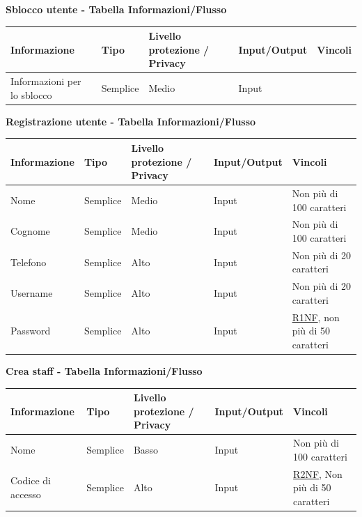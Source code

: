 \documentclass[a4paper]{article}
\begin{document}
\textbf{Sblocco utente  - Tabella Informazioni/Flusso}

\begin{center}
    \begin{tabularx}{1\textwidth}{|X|X|X|X|X|}
        \hline
        \textbf{Informazione} &\textbf{Tipo} & \textbf{Livello protezione / Privacy} & \textbf{Input/Output} & \textbf{Vincoli}\\
        \hline
        \hline
        Informazioni per lo sblocco & Semplice & Medio & Input & \\
        \hline
    \end{tabularx}
\end{center}

\textbf{Registrazione utente  - Tabella Informazioni/Flusso}

\begin{center}
    \begin{tabularx}{1\textwidth}{|X|X|X|X|X|}
        \hline
        \textbf{Informazione} &\textbf{Tipo} & \textbf{Livello protezione / Privacy} & \textbf{Input/Output} & \textbf{Vincoli}\\
        \hline
        \hline
        Nome & Semplice & Medio & Input & Non più di 100 caratteri\\
        \hline
        Cognome & Semplice & Medio & Input & Non più di 100 caratteri\\
        \hline
        Telefono & Semplice & Alto & Input & Non più di 20 caratteri\\
        \hline
        Username & Semplice & Alto & Input & Non più di 20 caratteri\\
        \hline
        Password & Semplice & Alto & Input & \hyperlink{R1NF}{R1NF}, non più di 50 caratteri\\
        \hline
    \end{tabularx}
\end{center}

\newpage

\textbf{Crea staff  - Tabella Informazioni/Flusso}

\begin{center}
    \begin{tabularx}{1\textwidth}{|X|X|X|X|X|}
        \hline
        \textbf{Informazione} &\textbf{Tipo} & \textbf{Livello protezione / Privacy} & \textbf{Input/Output} & \textbf{Vincoli}\\
        \hline
        \hline
        Nome & Semplice & Basso & Input & Non più di 100 caratteri\\
        \hline
        Codice di accesso & Semplice & Alto & Input & \hyperlink{R2NF}{R2NF}, Non più di 50 caratteri\\
        \hline
    \end{tabularx}
\end{center}
\end{document}
